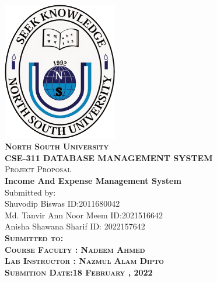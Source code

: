 \begin{titlepage}

\newcommand{\HRule}{\rule{\linewidth}{0.3mm}}
\center

\includegraphics[width=50mm]{nsu.png}\\
\vspace{0.5cm}
\textsc{\LARGE \bfseries North South University}\\[0.5cm] %
\vspace{0.5cm}
\textsc{\large \bfseries CSE-311 DATABASE MANAGEMENT SYSTEM}\\
\textsc{Project Proposal} \\[0.5cm]
\vspace{0.5cm}
\Large \textbf{Income And Expense Management System}\\[0.5cm]

\vspace{0.2cm}
Submitted by:\\
Shuvodip Biswas ID:2011680042         \\[0.1cm]
 Md. Tanvir Ann Noor Meem ID:2021516642\\[0.1cm]
    Anisha Shawana Sharif ID: 2022157642\\[0.1cm]
\bfseries
\vspace{0.5cm}
\textsc{Submitted to:}\\
\textsc{Course Faculty : Nadeem Ahmed}\\
\textsc{Lab Instructor : Nazmul Alam Dipto}\\[0.5cm]

\textsc{Submition Date:18 February , 2022}\\


\vfill
\end{titlepage}
